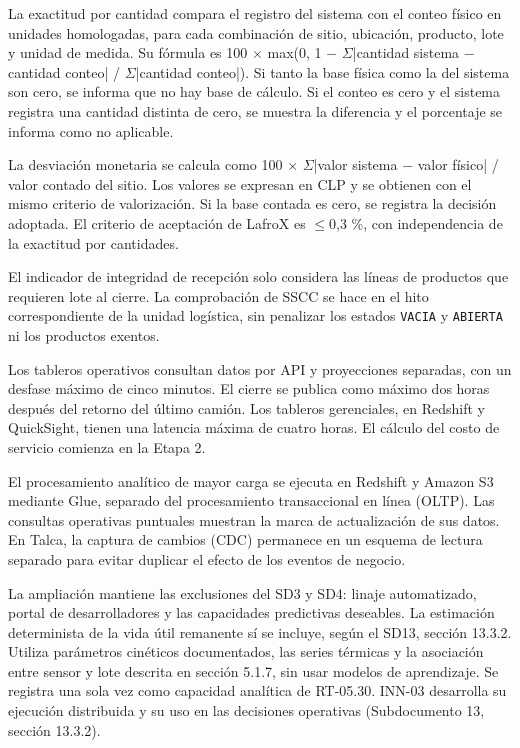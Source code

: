 La exactitud por cantidad compara el registro del sistema con el conteo físico en unidades homologadas, para cada combinación de sitio, ubicación, producto, lote y unidad de medida. Su fórmula es 100 \ensuremath{\times} max(0, 1 \ensuremath{-} \ensuremath{\Sigma}|cantidad sistema \ensuremath{-} cantidad conteo| / \ensuremath{\Sigma}|cantidad conteo|). Si tanto la base física como la del sistema son cero, se informa que no hay base de cálculo. Si el conteo es cero y el sistema registra una cantidad distinta de cero, se muestra la diferencia y el porcentaje se informa como no aplicable.

La desviación monetaria se calcula como 100 \ensuremath{\times} \ensuremath{\Sigma}|valor sistema \ensuremath{-} valor físico| / valor contado del sitio. Los valores se expresan en CLP y se obtienen con el mismo criterio de valorización. Si la base contada es cero, se registra la decisión adoptada. El criterio de aceptación de LafroX es \ensuremath{\leq}0,3 \%, con independencia de la exactitud por cantidades.

El indicador de integridad de recepción solo considera las líneas de productos que requieren lote al cierre. La comprobación de SSCC se hace en el hito correspondiente de la unidad logística, sin penalizar los estados \texttt{VACIA} y \texttt{ABIERTA} ni los productos exentos.

Los tableros operativos consultan datos por API y proyecciones separadas, con un desfase máximo de cinco minutos. El cierre se publica como máximo dos horas después del retorno del último camión. Los tableros gerenciales, en Redshift y QuickSight, tienen una latencia máxima de cuatro horas. El cálculo del costo de servicio comienza en la Etapa 2.

El procesamiento analítico de mayor carga se ejecuta en Redshift y Amazon S3 mediante Glue, separado del procesamiento transaccional en línea (OLTP). Las consultas operativas puntuales muestran la marca de actualización de sus datos. En Talca, la captura de cambios (CDC) permanece en un esquema de lectura separado para evitar duplicar el efecto de los eventos de negocio.

La ampliación mantiene las exclusiones del SD3 y SD4: linaje automatizado, portal de desarrolladores y las capacidades predictivas deseables. La estimación determinista de la vida útil remanente sí se incluye, según el SD13, sección 13.3.2. Utiliza parámetros cinéticos documentados, las series térmicas y la asociación entre sensor y lote descrita en sección 5.1.7, sin usar modelos de aprendizaje. Se registra una sola vez como capacidad analítica de RT-05.30. INN-03 desarrolla su ejecución distribuida y su uso en las decisiones operativas (Subdocumento 13, sección 13.3.2).

